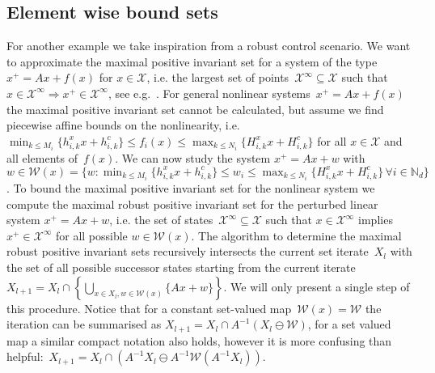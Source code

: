 \documentclass[a4paper, 12pt, twoside]{article}
\theoremstyle{definition}
\numberwithin{equation}{section}
\begin{document}
\subsection{Element wise bound sets}\label{exp:second:example}
%
For another example we take inspiration from a robust control scenario.
%
We want to approximate the maximal positive invariant set for a system of the type~$x^+=Ax + f(x)$ for $x\in\mathcal X$, i.e. the largest set of points~$\mathcal X^\infty\subseteq\mathcal X$ such that $x\in\mathcal X^\infty\Rightarrow x^+\in\mathcal X^\infty$, see e.g.~\cite{blanchini:2007}.
%
For general nonlinear systems~$x^+=Ax + f(x)$ the maximal positive invariant set cannot be calculated, but assume we find piecewise affine bounds on the nonlinearity, i.e. $\min_{k\leq M_i}\{h_{i,k}^x x + h_{i,k}^c\}\leq f_i(x)\leq\max_{k\leq N_i}\{H_{i,k}^x x + H_{i,k}^c\}$ for all $x\in\mathcal X$ and all elements of~$f(x)$.
%
We can now study the system $x^+=Ax+w$ with $w\in\mathcal W(x) = \{w:\min_{k\leq M_i}\{h_{i,k}^x x + h_{i,k}^c\}\leq w_i\leq\max_{k\leq N_i}\{H_{i,k}^x x + H_{i,k}^c\}\,\forall i\in\mathbb N_d\}$.
%
To bound the maximal positive invariant set for the nonlinear system we compute the maximal robust positive invariant set for the perturbed linear system $x^+=Ax+w$, i.e. the set of states~$\mathscr X^\infty\subseteq\mathcal X$ such that $x\in\mathscr X^\infty$ implies $x^+\in\mathscr X^\infty$ for all possible $w\in\mathcal W(x)$.
%
The algorithm to determine the maximal robust positive invariant sets recursively intersects the current set iterate~$X_l$ with the set of all possible successor states starting from the current iterate $X_{l+1}=X_l\cap\left\{\bigcup_{x\in X_l,w\in\mathcal W(x)}\{Ax+w\}\right\}$.
%
We will only present a single step of this procedure.
%
Notice that for a constant set-valued map~$\mathcal W(x) = \mathcal W$ the iteration can be summarised as $X_{l+1} = X_l\cap A^{-1}(X_l\ominus\mathcal W)$, for a set valued map a similar compact notation also holds, however it is more confusing than helpful:~$X_{l+1}=X_l\cap(A^{-1}X_l\ominus A^{-1}\mathcal W(A^{-1}X_l))$.
\end{document}
